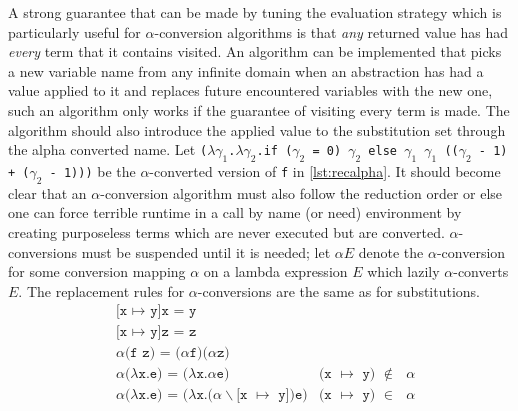 \documentclass[11pt,oneside,a4paper]{report}
\begin{document}
A strong guarantee that can be made by tuning the evaluation strategy which is particularly useful for $\alpha$-conversion algorithms is that \textit{any} returned value has had \textit{every} term that it contains visited.
An algorithm can be implemented that picks a new variable name from any infinite domain when an abstraction has had a value applied to it and replaces future encountered variables with the new one, such an algorithm only works if the guarantee of visiting every term is made.
The algorithm should also introduce the applied value to the substitution set through the alpha converted name.
Let \texttt{($\lambda\gamma_1$.$\lambda\gamma_2$.if ($\gamma_2$ = 0) $\gamma_2$ else $\gamma_1$ $\gamma_1$ (($\gamma_2$ - 1) + ($\gamma_2$ - 1)))} be the $\alpha$-converted version of \texttt{f} in \autoref{lst:recalpha}.
It should become clear that an $\alpha$-conversion algorithm must also follow the reduction order or else one can force terrible runtime in a call by name (or need) environment by creating purposeless terms which are never executed but are converted.
$\alpha$-conversions must be suspended until it is needed; let $\alpha E$ denote the $\alpha$-conversion for some conversion mapping $\alpha$ on a lambda expression $E$ which lazily $\alpha$-converts $E$.
The replacement rules for $\alpha$-conversions are the same as for substitutions.
\begin{align}
  &\texttt{[x $\mapsto$ y]x = y} &\label{eq:alpharep}\\
  &\texttt{[x $\mapsto$ y]z = z} &\tag*{}\\
  &\texttt{$\alpha$(f z) = ($\alpha$f)($\alpha$z)} &\tag*{}\\
  &\texttt{$\alpha$($\lambda$x.e) = ($\lambda$x.$\alpha$e)} & \texttt{(x $\mapsto$ y) $\notin$ $\alpha$} \tag*{}\\
  &\texttt{$\alpha$($\lambda$x.e) = ($\lambda$x.($\alpha\backslash$[x $\mapsto$ y])e)} & \texttt{(x $\mapsto$ y) $\in$ $\alpha$} \label{eq:alprepsub}
\end{align}
\end{document}
